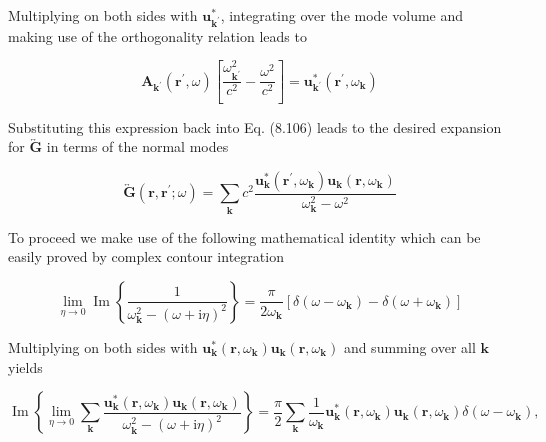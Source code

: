 \documentclass[10pt]{article}
\begin{document}
Multiplying on both sides with $\mathbf{u}_{\mathbf{k}^{\prime}}^{*}$, integrating over the mode volume and making use of the orthogonality relation leads to


\begin{equation*}
\mathbf{A}_{\mathbf{k}^{\prime}}\left(\mathbf{r}^{\prime}, \omega\right)\left[\frac{\omega_{\mathbf{k}^{\prime}}^{2}}{c^{2}}-\frac{\omega^{2}}{c^{2}}\right]=\mathbf{u}_{\mathbf{k}^{\prime}}^{*}\left(\mathbf{r}^{\prime}, \omega_{\mathbf{k}}\right) \tag{8.110}
\end{equation*}


Substituting this expression back into Eq. (8.106) leads to the desired expansion for $\overleftrightarrow{\mathbf{G}}$ in terms of the normal modes


\begin{equation*}
\overleftrightarrow{\mathbf{G}}\left(\mathbf{r}, \mathbf{r}^{\prime} ; \omega\right)=\sum_{\mathbf{k}} c^{2} \frac{\mathbf{u}_{\mathbf{k}}^{*}\left(\mathbf{r}^{\prime}, \omega_{\mathbf{k}}\right) \mathbf{u}_{\mathbf{k}}\left(\mathbf{r}, \omega_{\mathbf{k}}\right)}{\omega_{\mathbf{k}}^{2}-\omega^{2}} \tag{8.111}
\end{equation*}


To proceed we make use of the following mathematical identity which can be easily proved by complex contour integration


\begin{equation*}
\lim _{\eta \rightarrow 0} \operatorname{Im}\left\{\frac{1}{\omega_{\mathbf{k}}^{2}-(\omega+\mathrm{i} \eta)^{2}}\right\}=\frac{\pi}{2 \omega_{\mathbf{k}}}\left[\delta\left(\omega-\omega_{\mathbf{k}}\right)-\delta\left(\omega+\omega_{\mathbf{k}}\right)\right] \tag{8.112}
\end{equation*}


Multiplying on both sides with $\mathbf{u}_{\mathbf{k}}^{*}\left(\mathbf{r}, \omega_{\mathbf{k}}\right) \mathbf{u}_{\mathbf{k}}\left(\mathbf{r}, \omega_{\mathbf{k}}\right)$ and summing over all $\mathbf{k}$ yields


\begin{equation*}
\operatorname{Im}\left\{\lim _{\eta \rightarrow 0} \sum_{\mathbf{k}} \frac{\mathbf{u}_{\mathbf{k}}^{*}\left(\mathbf{r}, \omega_{\mathbf{k}}\right) \mathbf{u}_{\mathbf{k}}\left(\mathbf{r}, \omega_{\mathbf{k}}\right)}{\omega_{\mathbf{k}}^{2}-(\omega+\mathrm{i} \eta)^{2}}\right\}=\frac{\pi}{2} \sum_{\mathbf{k}} \frac{1}{\omega_{\mathbf{k}}} \mathbf{u}_{\mathbf{k}}^{*}\left(\mathbf{r}, \omega_{\mathbf{k}}\right) \mathbf{u}_{\mathbf{k}}\left(\mathbf{r}, \omega_{\mathbf{k}}\right) \delta\left(\omega-\omega_{\mathbf{k}}\right), \tag{8.113}
\end{equation*}
\end{document}
